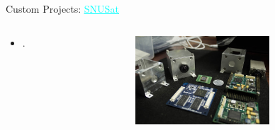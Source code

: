 \begin{frame}{Custom Projects: \href{http://www.madeinepal.com/2016/03/complete-guide-to-designing-camera.html}{\textcolor{cyan}{\underline{SNUSat}}}}

    \begin{columns}[t]
        \begin{column}[t]{0.6\textwidth}
            \begin{itemize}
                \item .
            \end{itemize}
        \end{column}
        \begin{column}[t]{0.5\textwidth}
            \begin{figure}[!ht]
                \begin{center}
                    \includegraphics[width=5cm]{figures/snucam}
                \end{center}
            \end{figure}
        \end{column}
    \end{columns}

\end{frame}


